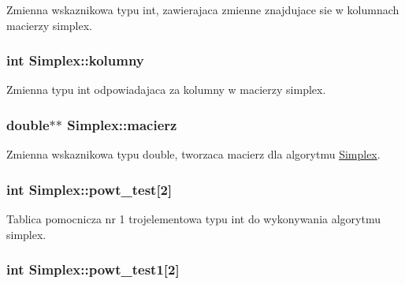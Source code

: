 \-Zmienna wskaznikowa typu int, zawierajaca zmienne znajdujace sie w kolumnach macierzy simplex. 

\hypertarget{class_simplex_ae237c38eca2984b94334ade925758eb9}{
\subsubsection[{kolumny}]{\setlength{\rightskip}{0pt plus 5cm}int {\bf \-Simplex\-::kolumny}}}\label{class_simplex_ae237c38eca2984b94334ade925758eb9}


\-Zmienna typu int odpowiadajaca za kolumny w macierzy simplex. 

\hypertarget{class_simplex_ae1aa6bc039eca109d9af4fc423a49510}{
\subsubsection[{macierz}]{\setlength{\rightskip}{0pt plus 5cm}double$\ast$$\ast$ {\bf \-Simplex\-::macierz}}}\label{class_simplex_ae1aa6bc039eca109d9af4fc423a49510}


\-Zmienna wskaznikowa typu double, tworzaca macierz dla algorytmu \hyperlink{class_simplex}{\-Simplex}. 

\hypertarget{class_simplex_a106e79929804646eec2f30382195ee1a}{
\subsubsection[{powt\-\_\-test}]{\setlength{\rightskip}{0pt plus 5cm}int {\bf \-Simplex\-::powt\-\_\-test}\mbox{[}2\mbox{]}}}\label{class_simplex_a106e79929804646eec2f30382195ee1a}


\-Tablica pomocnicza nr 1 trojelementowa typu int do wykonywania algorytmu simplex. 

\hypertarget{class_simplex_a5f74bdeb5992f39d279d7cd9a43b856b}{
\subsubsection[{powt\-\_\-test1}]{\setlength{\rightskip}{0pt plus 5cm}int {\bf \-Simplex\-::powt\-\_\-test1}\mbox{[}2\mbox{]}}}\label{class_simplex_a5f74bdeb5992f39d279d7cd9a43b856b}



